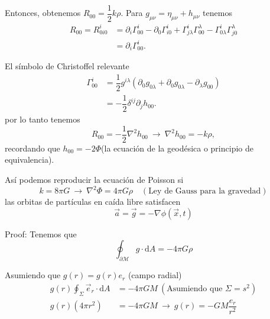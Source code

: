 \documentclass[../main]{subfiles}
\begin{document}
Entonces, obtenemos $R_{00}=\dfrac{1}{2}k\rho$. Para $g_{\mu\nu}=\eta_{\mu\nu}+h_{\mu\nu}$ tenemos 
\begin{equation}
    \begin{split}
        R_{00}=R^{i}_{0i0}&=\partial_i \Gamma^{i}_{00}-\partial_0 \Gamma^{i}_{i0}+\Gamma^{i}_{j\lambda}\Gamma^{\lambda}_{00}-\Gamma^{i}_{0\lambda}\Gamma^{\lambda}_{j0}\\
        &=\partial_i \Gamma^{i}_{00}.
    \end{split}
\end{equation}

El símbolo de Christoffel relevante 
\begin{equation}
    \begin{split}
        \Gamma^{i}_{00}&=\dfrac{1}{2}g^{i\lambda}(\partial_0 g_{0\lambda}+\partial_0 g_{0\lambda}-\partial_{\lambda}g_{00})\\
        &=-\dfrac{1}{2}\delta^{ij}\partial_j h_00.
    \end{split}
\end{equation}
por lo tanto tenemos 
\begin{equation}
    R_{00}=-\dfrac{1}{2}\nabla^2 h_00 \ \rightarrow \ \nabla^2 h_{00}=-k\rho,
\end{equation}
recordando que $h_{00}=-2\Phi$(la ecuación de la geodésica o principio de equivalencia).

Así podemos reproducir la ecuación de Poisson si 
\begin{equation}
    k=8\pi G \ \rightarrow \ \nabla^2 \Phi = 4\pi G\rho \quad (\text{Ley de Gauss para la gravedad})
\end{equation}
las orbitas de partículas en caída libre satisfacen 
\begin{equation}
    \vec{a}=\vec{g}=-\nabla \phi(\vec{x}, t)
\end{equation}

Proof: Tenemos que 
\begin{equation}
    \oint_{\partial \mathcal{M}} g \cdot \mathrm{d}A=-4\pi G\rho 
\end{equation}

Asumiendo que $g(r)=g(r)e_r$ (campo radial)
\begin{equation}
    \begin{split}
        g(r)\oint_{\Sigma} \vec{e}_r \cdot \mathrm{d}A &=-4\pi GM \ (\text{Asumiendo que } \Sigma=s^2) \\
        g(r)(4\pi r^2)&=-4\pi GM \ \rightarrow \ g(r)=-GM\dfrac{e_r}{r^2}
    \end{split}
\end{equation}
\end{document}
